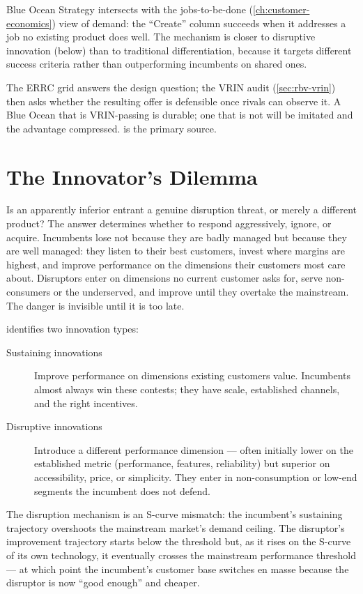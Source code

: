 Blue Ocean Strategy intersects with the jobs-to-be-done (\cref{ch:customer-economics})
view of demand: the ``Create'' column succeeds when it addresses a job no existing product
does well. The mechanism is closer to disruptive innovation (below) than to traditional
differentiation, because it targets different success criteria rather than outperforming
incumbents on shared ones.

The ERRC grid answers the design question; the VRIN audit (\cref{sec:rbv-vrin}) then asks
whether the resulting offer is defensible once rivals can observe it. A Blue Ocean that is
VRIN-passing is durable; one that is not will be imitated and the advantage compressed.
\textcite{kim2015} is the primary source.

\section{The Innovator's Dilemma}\label{sec:innovators-dilemma}

Is an apparently inferior entrant a genuine disruption threat, or merely a different product?
The answer determines whether to respond aggressively, ignore, or acquire. Incumbents lose
not because they are badly managed but because they are well managed: they listen to their
best customers, invest where margins are highest, and improve performance on the dimensions
their customers most care about. Disruptors enter on dimensions no current customer asks for,
serve non-consumers or the underserved, and improve until they overtake the mainstream. The
danger is invisible until it is too late.

\textcite{christensen1997} identifies two innovation types:
\begin{description}
  \item[Sustaining innovations] Improve performance on dimensions existing customers value.
        Incumbents almost always win these contests; they have scale, established channels,
        and the right incentives.
  \item[Disruptive innovations] Introduce a different performance dimension --- often
        initially lower on the established metric (performance, features, reliability) but
        superior on accessibility, price, or simplicity. They enter in non-consumption or
        low-end segments the incumbent does not defend.
\end{description}
The disruption mechanism is an S-curve mismatch: the incumbent's sustaining trajectory
overshoots the mainstream market's demand ceiling. The disruptor's improvement trajectory
starts below the threshold but, as it rises on the S-curve of its own technology, it
eventually crosses the mainstream performance threshold --- at which point the incumbent's
customer base switches en masse because the disruptor is now ``good enough'' and cheaper.

